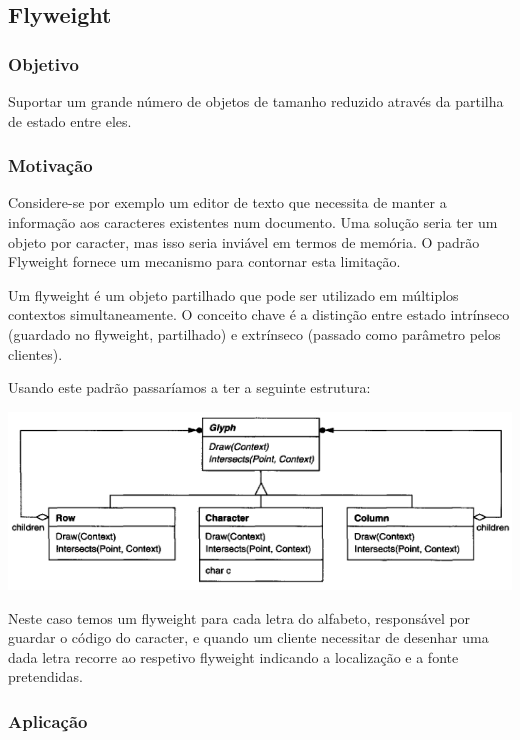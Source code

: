 \subsection{Flyweight}

\subsubsection{Objetivo}

Suportar um grande número de objetos de tamanho reduzido através da partilha de estado entre eles.

\subsubsection{Motivação}

Considere-se por exemplo um editor de texto que necessita de manter a informação aos caracteres existentes num documento. Uma solução seria ter um objeto por caracter, mas isso seria inviável em termos de memória. O padrão Flyweight fornece um mecanismo para contornar esta limitação.

Um flyweight é um objeto partilhado que pode ser utilizado em múltiplos contextos simultaneamente. O conceito chave é a distinção entre estado intrínseco (guardado no flyweight, partilhado) e extrínseco (passado como parâmetro pelos clientes).

Usando este padrão passaríamos a ter a seguinte estrutura:

\centerline{\includegraphics[scale=.7]{img/flyweight/motivation.png}}

Neste caso temos um flyweight para cada letra do alfabeto, responsável por guardar o código do caracter, e quando um cliente necessitar de desenhar uma dada letra recorre ao respetivo flyweight indicando a localização e a fonte pretendidas.

\subsubsection{Aplicação}

